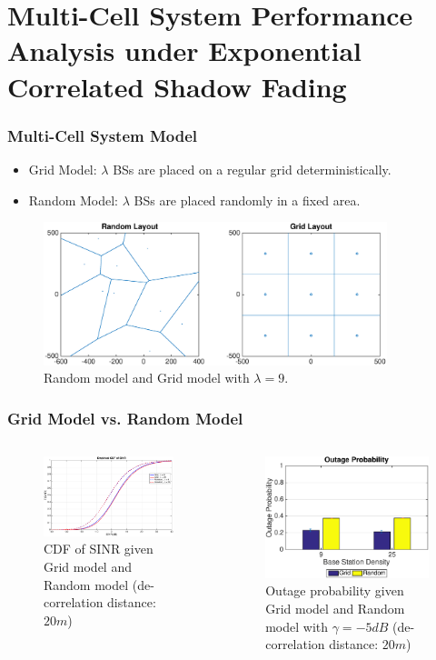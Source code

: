 \documentclass{beamer}
\begin{document}
\section{Multi-Cell System Performance Analysis under Exponential Correlated Shadow Fading}
\begin{frame}
\frametitle{Multi-Cell System Model}
\begin{itemize}
 \item Grid Model: $\lambda$ BSs are placed on a regular grid deterministically.
 \item Random Model: $\lambda$ BSs are placed randomly in a fixed area.
\end{itemize}
 \begin{figure}
 \centering
 \includegraphics[width=10cm]{systemLayout.eps}
 \caption{Random model and Grid model with $\lambda = 9$.}
 \label{4:RandomLayout}
 \end{figure}
\end{frame}
\begin{frame}
\frametitle{Grid Model vs. Random Model}
\begin{columns}[c]
 \begin{figure}
 \centering
 \includegraphics[width=6cm]{GridVSRandom.eps}
 \caption{CDF of SINR given Grid model and Random model (de-correlation distance: $20m$)}
 \label{4:cdf1}
 \end{figure}
 \begin{figure}
 \centering
 \includegraphics[width=6cm]{OutageProbGridVSRandom.eps}
 \caption{Outage probability given Grid model and Random model with $\gamma = -5dB$ (de-correlation distance: $20m$)}
 \label{4:outage1}
 \end{figure}
 \end{columns}
\end{frame}
\end{document}
